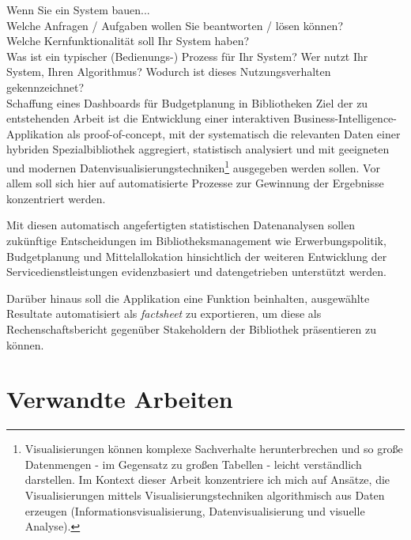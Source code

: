 Wenn Sie ein System bauen...\\
Welche Anfragen / Aufgaben wollen Sie beantworten / lösen können?\\
Welche Kernfunktionalität soll Ihr System haben?\\
Was ist ein typischer (Bedienungs-) Prozess für Ihr System? Wer nutzt Ihr System, Ihren Algorithmus? Wodurch ist dieses Nutzungsverhalten gekennzeichnet?\\


Schaffung eines Dashboards für Budgetplanung in Bibliotheken Ziel der zu entstehenden Arbeit ist die Entwicklung einer interaktiven Business-Intelligence-Applikation als proof-of-concept,
mit der systematisch die relevanten Daten einer hybriden Spezialbibliothek aggregiert, statistisch
analysiert und mit geeigneten und modernen Datenvisualisierungstechniken\footnote{Visualisierungen können komplexe Sachverhalte herunterbrechen und
so große Datenmengen - im Gegensatz zu großen Tabellen - leicht verständlich
darstellen. Im Kontext dieser Arbeit konzentriere ich mich auf Ansätze, die Visualisierungen mittels Visualisierungstechniken algorithmisch aus
Daten erzeugen (Informationsvisualisierung, Datenvisualisierung und visuelle Analyse).\cite{mayank_yuvaraj_infographics_2017}}
ausgegeben werden sollen.
Vor allem soll sich hier auf automatisierte Prozesse zur Gewinnung der Ergebnisse konzentriert werden.

Mit diesen automatisch angefertigten statistischen Datenanalysen sollen zukünftige
Entscheidungen im Bibliotheksmanagement wie Erwerbungspolitik, Budgetplanung und
Mittelallokation hinsichtlich der weiteren Entwicklung der
Servicedienstleistungen evidenzbasiert und datengetrieben unterstützt werden.

Darüber hinaus soll die Applikation  eine Funktion beinhalten, ausgewählte
Resultate automatisiert als \textit{factsheet} zu exportieren, um diese
als Rechenschaftsbericht gegenüber Stakeholdern der Bibliothek präsentieren zu können.

\section{Verwandte Arbeiten}


